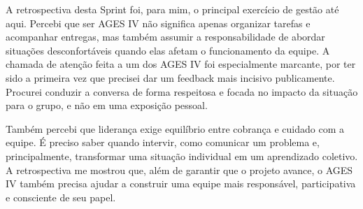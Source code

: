 \begin{reflection}
\noindent \originaltab{}A retrospectiva desta Sprint foi, para mim, o principal exercício de gestão até aqui. Percebi que ser AGES IV não significa apenas organizar tarefas e acompanhar entregas, mas também assumir a responsabilidade de abordar situações desconfortáveis quando elas afetam o funcionamento da equipe. A chamada de atenção feita a um dos AGES IV foi especialmente marcante, por ter sido a primeira vez que precisei dar um feedback mais incisivo publicamente. Procurei conduzir a conversa de forma respeitosa e focada no impacto da situação para o grupo, e não em uma exposição pessoal.\par

\noindent Também percebi que liderança exige equilíbrio entre cobrança e cuidado com a equipe. É preciso saber quando intervir, como comunicar um problema e, principalmente, transformar uma situação individual em um aprendizado coletivo. A retrospectiva me mostrou que, além de garantir que o projeto avance, o AGES IV também precisa ajudar a construir uma equipe mais responsável, participativa e consciente de seu papel.\par

\end{reflection}

